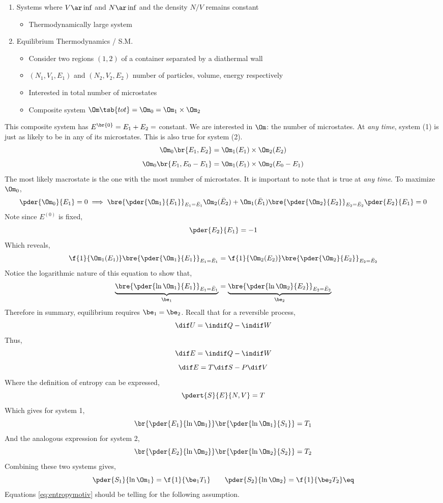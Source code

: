 \documentclass{article}
\begin{document}
\begin{enumerate}
        \item Systems where $V \ar \inf$ and $N \ar \inf$ and the density $N/V$ remains constant
        \begin{itemize}
                \item Thermodynamically large system
        \end{itemize}
        \item Equilibrium Thermodynamics / S.M.
        \begin{itemize}
                \item Consider two regions $(1,2)$ of a container separated by a diathermal wall
                \item $(N_1, V_1, E_1)$ and $(N_2, V_2, E_2)$ number of particles, volume, energy respectively
                \item Interested in total number of microstates
                \item Composite system $\Om\tsb{tot} = \Om_0 = \Om_1 \times \Om_2$
        \end{itemize}
\end{enumerate}
This composite system has $E^{\br{0}} = E_1 + E_2 = $ constant. We are interested in $\Om$: the number of microstates. At \textit{any time}, system (1) is just as likely to be in any of its microstates. This is also true for system (2).
\[ \Om_0\br{E_1, E_2} = \Om_1(E_1) \times \Om_2(E_2) \]
\[ \Om_0\br{E_1, E_0 - E_1} = \Om_1(E_1) \times \Om_2(E_0 - E_1) \]
The most likely macrostate is the one with the most number of microstates. It is important to note that is true at \textit{any time}. To maximize $\Om_0$,
\[ \pder{\Om_0}{E_1} = 0 \implies \bre{\pder{\Om_1}{E_1}}_{E_1 = \bar{E}_1} \Om_2(\bar{E}_2) + \Om_1(\bar{E}_1) \bre{\pder{\Om_2}{E_2}}_{E_2 = \bar{E}_2} \pder{E_2}{E_1} = 0 \]
Note since $E^{(0)}$ is fixed,
\[ \pder{E_2}{E_1} = -1 \]
Which reveals,
\[ \f{1}{\Om_1(E_1)} \bre{\pder{\Om_1}{E_1}}_{E_1 = \bar{E}_1} = \f{1}{\Om_2(E_2)} \bre{\pder{\Om_2}{E_2}}_{E_2 = \bar{E}_2} \]
Notice the logarithmic nature of this equation to show that,
\[ \underbrace{\bre{\pder{\ln\Om_1}{E_1}}_{E_1 = \bar{E}_1}}_{\be_1} = \underbrace{\bre{\pder{\ln\Om_2}{E_2}}_{E_2 = \bar{E}_2}}_{\be_2} \]
Therefore in summary, equilibrium requires $\be_1 = \be_2$. Recall that for a reversible process,
\[ \dif U = \indif Q - \indif W \]
Thus,
\[ \dif E = \indif Q - \indif W \]
\[ \dif E = T \dif S - P \dif V \]
Where the definition of entropy can be expressed,
\[ \pdert{S}{E}{N,V} = T \]
Which gives for system 1,
\[ \br{\pder{E_1}{\ln\Om_1}} \br{\pder{\ln\Om_1}{S_1}} = T_1 \]
And the analogous expression for system 2,
\[ \br{\pder{E_2}{\ln\Om_2}} \br{\pder{\ln\Om_2}{S_2}} = T_2 \]
Combining these two systems gives,
\[ \pder{S_1}{\ln\Om_1} = \f{1}{\be_1T_1} \qquad \pder{S_2}{\ln\Om_2} = \f{1}{\be_2T_2} \eq \label{eq:entropymotiv}\]
Equations \eqref{eq:entropymotiv} should be telling for the following assumption. \\
\end{document}
